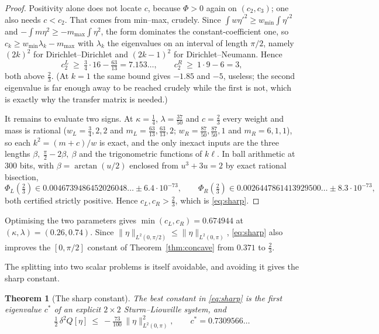 \documentclass[11pt]{article}
\newtheorem{theorem}{Theorem}
\theoremstyle{definition}
\begin{document}
\begin{proof}
Positivity alone does not locate $c$, because $\Phi>0$ again on $(c_2,c_3)$; one also
needs $c<c_2$. That comes from min--max, crudely. Since $\int w\eta'^2\ge
w_{\min}\int\eta'^2$ and $-\int m\eta^2\ge-m_{\max}\int\eta^2$, the form dominates the
constant-coefficient one, so $c_k\ge w_{\min}\lambda_k-m_{\max}$ with $\lambda_k$ the
eigenvalues on an interval of length $\pi/2$, namely $(2k)^2$ for Dirichlet--Dirichlet and
$(2k-1)^2$ for Dirichlet--Neumann. Hence
\[
  c_2^L\ \ge\ \tfrac34\cdot16-\tfrac{63}{13}=7.153\ldots,
  \qquad
  c_2^R\ \ge\ 1\cdot 9-6=3 ,
\]
both above $\tfrac23$. (At $k=1$ the same bound gives $-1.85$ and $-5$, useless; the
second eigenvalue is far enough away to be reached crudely while the first is not, which
is exactly why the transfer matrix is needed.)

It remains to evaluate two signs. At $\kappa=\tfrac14$, $\lambda=\tfrac{37}{50}$ and
$c=\tfrac23$ every weight and mass is rational ($w_L=\tfrac34,2,2$ and
$m_L=\tfrac{63}{13},\tfrac{63}{13},2$; $w_R=\tfrac{87}{50},\tfrac{87}{50},1$ and
$m_R=6,1,1$), so each $k^2=(m+c)/w$ is exact, and the only inexact inputs are the three
lengths $\beta,\ \tfrac\pi2-2\beta,\ \beta$ and the trigonometric functions of $k\ell$. In
ball arithmetic at $300$ bits, with $\beta=\arctan(u/2)$ enclosed from $u^3+3u=2$ by exact
rational bisection,
\[
  \Phi_L(\tfrac23)\in0.0046739486452026048\ldots\pm6.4\cdot10^{-73},\qquad
  \Phi_R(\tfrac23)\in0.0026447861413929500\ldots\pm8.3\cdot10^{-73},
\]
both certified strictly positive. Hence $c_L,c_R>\tfrac23$, which is \eqref{eq:sharp}.
\end{proof}

Optimising the two parameters gives $\min(c_L,c_R)=0.674944$ at
$(\kappa,\lambda)=(0.26,0.74)$. Since $\|\eta\|_{L^2(0,\pi/2)}\le\|\eta\|_{L^2(0,\pi)}$,
\eqref{eq:sharp} also improves the $[0,\pi/2]$ constant of Theorem~\ref{thm:concave} from
$0.371$ to $\tfrac23$.

The splitting into two scalar problems is itself avoidable, and avoiding it gives the
sharp constant.

\begin{theorem}[The sharp constant]\label{thm:system}
The best constant in \eqref{eq:sharp} is the first eigenvalue $c^\ast$ of an explicit
$2\times2$ Sturm--Liouville system, and
\begin{equation}\label{eq:sharpsys}
  \tfrac12\,\delta^2Q[\eta]\ \le\ -\tfrac{73}{100}\,\|\eta\|^2_{L^2(0,\pi)},
  \qquad c^\ast=0.7309566\ldots
\end{equation}
\end{theorem}
\end{document}
